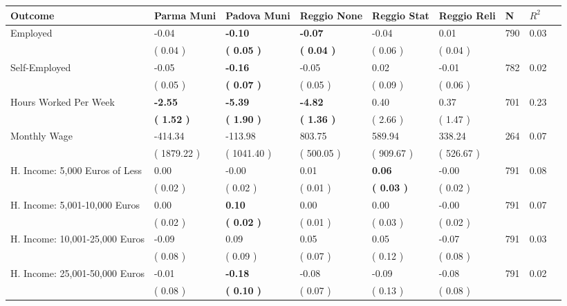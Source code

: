 \begin{tabular}{L{6.2cm} C{1.8cm} C{1.8cm} C{1.8cm} C{1.8cm} C{1.8cm} C{1.8cm} C{0.3cm} C{0.3cm}}
\toprule
 \textbf{Outcome} & \textbf{Parma Muni} & \textbf{Padova Muni} & \textbf{Reggio None} & \textbf{Reggio Stat} & \textbf{Reggio Reli} & \textbf{N} & \textbf{$ R^2$} \\
\midrule
Employed &     -0.04 & \textbf{    -0.10} & \textbf{    -0.07} &     -0.04 &      0.01  & 790 &       0.03 \\ 
 & (     0.04 ) & \textbf{(     0.05 )} & \textbf{(     0.04 )} & (     0.06 ) & (     0.04 )  & \\
Self-Employed &     -0.05 & \textbf{    -0.16} &     -0.05 &      0.02 &     -0.01  & 782 &       0.02 \\ 
 & (     0.05 ) & \textbf{(     0.07 )} & (     0.05 ) & (     0.09 ) & (     0.06 )  & \\
Hours Worked Per Week & \textbf{    -2.55} & \textbf{    -5.39} & \textbf{    -4.82} &      0.40 &      0.37  & 701 &       0.23 \\ 
 & \textbf{(     1.52 )} & \textbf{(     1.90 )} & \textbf{(     1.36 )} & (     2.66 ) & (     1.47 )  & \\
Monthly Wage &   -414.34 &   -113.98 &    803.75 &    589.94 &    338.24  & 264 &       0.07 \\ 
 & (  1879.22 ) & (  1041.40 ) & (   500.05 ) & (   909.67 ) & (   526.67 )  & \\
H. Income: 5,000 Euros of Less &      0.00 &     -0.00 &      0.01 & \textbf{     0.06} &     -0.00  & 791 &       0.08 \\ 
 & (     0.02 ) & (     0.02 ) & (     0.01 ) & \textbf{(     0.03 )} & (     0.02 )  & \\
H. Income: 5,001-10,000 Euros &      0.00 & \textbf{     0.10} &      0.00 &      0.00 &     -0.00  & 791 &       0.07 \\ 
 & (     0.02 ) & \textbf{(     0.02 )} & (     0.01 ) & (     0.03 ) & (     0.02 )  & \\
H. Income: 10,001-25,000 Euros &     -0.09 &      0.09 &      0.05 &      0.05 &     -0.07  & 791 &       0.03 \\ 
 & (     0.08 ) & (     0.09 ) & (     0.07 ) & (     0.12 ) & (     0.08 )  & \\
H. Income: 25,001-50,000 Euros &     -0.01 & \textbf{    -0.18} &     -0.08 &     -0.09 &     -0.08  & 791 &       0.02 \\ 
 & (     0.08 ) & \textbf{(     0.10 )} & (     0.07 ) & (     0.13 ) & (     0.08 )  & \\

\end{tabular}
